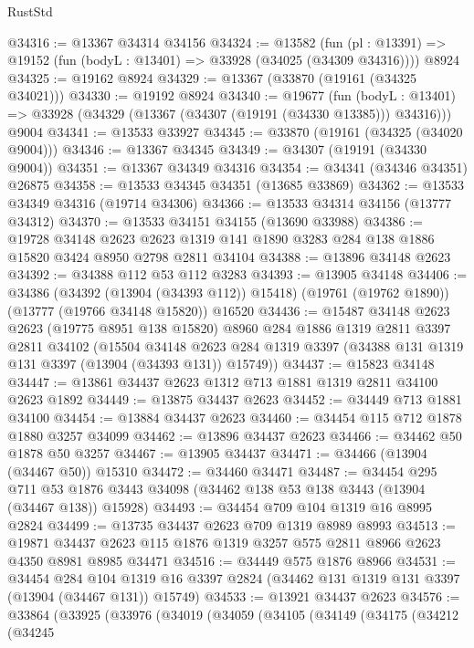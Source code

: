 \begin{lexlean}{RustStd}
\begin{coremodule}
@34316 := @13367 @34314 @34156
@34324 := @13582
    (fun (pl : @13391) => @19152 (fun (bodyL : @13401) => @33928 (@34025 (@34309 @34316))))
    @8924
@34325 := @19162 @8924
@34329 := @13367 (@33870 (@19161 (@34325 @34021)))
@34330 := @19192 @8924
@34340 := @19677
    (fun (bodyL : @13401) => @33928 (@34329 (@13367 (@34307 (@19191 (@34330 @13385))) @34316)))
    @9004
@34341 := @13533 @33927
@34345 := @33870 (@19161 (@34325 (@34020 @9004)))
@34346 := @13367 @34345
@34349 := @34307 (@19191 (@34330 @9004))
@34351 := @13367 @34349 @34316
@34354 := @34341 (@34346 @34351) @26875
@34358 := @13533 @34345 @34351 (@13685 @33869)
@34362 := @13533 @34349 @34316 (@19714 @34306)
@34366 := @13533 @34314 @34156 (@13777 @34312)
@34370 := @13533 @34151 @34155 (@13690 @33988)
@34386 := @19728
    @34148
    @2623
    @2623
    @1319
    @141
    @1890
    @3283
    @284
    @138
    @1886
    @15820
    @3424
    @8950
    @2798
    @2811
    @34104
@34388 := @13896 @34148 @2623
@34392 := @34388 @112 @53 @112 @3283
@34393 := @13905 @34148
@34406 := @34386
    (@34392 (@13904 (@34393 @112)) @15418)
    (@19761 (@19762 @1890))
    (@13777 (@19766 @34148 @15820))
    @16520
@34436 := @15487
    @34148
    @2623
    @2623
    (@19775 @8951 @138 @15820)
    @8960
    @284
    @1886
    @1319
    @2811
    @3397
    @2811
    @34102
    (@15504
      @34148
      @2623
      @284
      @1319
      @3397
      (@34388 @131 @1319 @131 @3397 (@13904 (@34393 @131)) @15749))
@34437 := @15823 @34148
@34447 := @13861 @34437 @2623 @1312 @713 @1881 @1319 @2811 @34100 @2623 @1892
@34449 := @13875 @34437 @2623
@34452 := @34449 @713 @1881 @34100
@34454 := @13884 @34437 @2623
@34460 := @34454 @115 @712 @1878 @1880 @3257 @34099
@34462 := @13896 @34437 @2623
@34466 := @34462 @50 @1878 @50 @3257
@34467 := @13905 @34437
@34471 := @34466 (@13904 (@34467 @50)) @15310
@34472 := @34460 @34471
@34487 := @34454
    @295
    @711
    @53
    @1876
    @3443
    @34098
    (@34462 @138 @53 @138 @3443 (@13904 (@34467 @138)) @15928)
@34493 := @34454 @709 @104 @1319 @16 @8995 @2824
@34499 := @13735 @34437 @2623 @709 @1319 @8989 @8993
@34513 := @19871 @34437 @2623 @115 @1876 @1319 @3257 @575 @2811 @8966 @2623 @4350 @8981 @8985 @34471
@34516 := @34449 @575 @1876 @8966
@34531 := @34454
    @284
    @104
    @1319
    @16
    @3397
    @2824
    (@34462 @131 @1319 @131 @3397 (@13904 (@34467 @131)) @15749)
@34533 := @13921 @34437 @2623
@34576 := @33864
    (@33925
      (@33976
        (@34019
          (@34059
            (@34105
              (@34149
                (@34175
                  (@34212
                    (@34245

\end{coremodule}
\end{lexlean}
